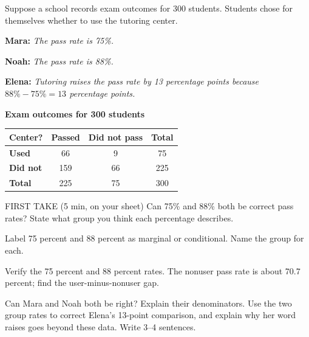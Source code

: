 \documentclass[14pt]{extarticle}
\begin{document}
\pagestyle{empty}


\noindent\begin{minipage}[t]{0.57\linewidth}
\vspace{0pt}
Suppose a school records exam outcomes for 300 students. Students chose for themselves whether to use the tutoring center.\par\smallskip \textbf{Mara:} \emph{The pass rate is 75\%.}\par \textbf{Noah:} \emph{The pass rate is 88\%.}\par \textbf{Elena:} \emph{Tutoring raises the pass rate by 13 percentage points because $88\%-75\%=13$ percentage points.}\par
\end{minipage}\hfill
\begin{minipage}[t]{0.40\linewidth}
\vspace{0pt}
\begin{center}
\textbf{Exam outcomes for 300 students}\par\smallskip
\begin{tabular}{|l|c|c|c|}
\hline
\textbf{Center?} & \textbf{Passed} & \textbf{Did not pass} & \textbf{Total} \\ \hline
\textbf{Used} & 66 & 9 & 75 \\ \hline
\textbf{Did not} & 159 & 66 & 225 \\ \hline
\textbf{Total} & 225 & 75 & 300 \\ \hline
\end{tabular}
\end{center}
\end{minipage}

\begin{firsttakebox}{FIRST TAKE (5 min, on your sheet)}
Can 75\% and 88\% both be correct pass rates? State what group you think each percentage describes.
\end{firsttakebox}

\begin{description}[leftmargin=1.15in, labelwidth=1in, itemsep=2pt, topsep=2pt]
  \item[\dokbadge{1}~(a)] Label 75 percent and 88 percent as marginal or conditional. Name the group for each.
  \item[\dokbadge{2}~(b)] Verify the 75 percent and 88 percent rates. The nonuser pass rate is about 70.7 percent; find the user-minus-nonuser gap.
  \item[\dokbadge{3}~(c)] Can Mara and Noah both be right? Explain their denominators. Use the two group rates to correct Elena's 13-point comparison, and explain why her word raises goes beyond these data. Write 3--4 sentences.
\end{description}
\end{document}
